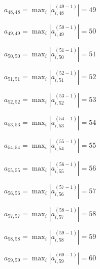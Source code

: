 \documentclass[a4paper,12pt]{article}
\begin{document}
$a _{ 48, 48 } =  \max _i |a _{ i, 48 } ^{ (49 - 1) } | = 49$

$a _{ 49, 49 } =  \max _i |a _{ i, 49 } ^{ (50 - 1) } | = 50$

$a _{ 50, 50 } =  \max _i |a _{ i, 50 } ^{ (51 - 1) } | = 51$

$a _{ 51, 51 } =  \max _i |a _{ i, 51 } ^{ (52 - 1) } | = 52$

$a _{ 52, 52 } =  \max _i |a _{ i, 52 } ^{ (53 - 1) } | = 53$

$a _{ 53, 53 } =  \max _i |a _{ i, 53 } ^{ (54 - 1) } | = 54$

$a _{ 54, 54 } =  \max _i |a _{ i, 54 } ^{ (55 - 1) } | = 55$

$a _{ 55, 55 } =  \max _i |a _{ i, 55 } ^{ (56 - 1) } | = 56$

$a _{ 56, 56 } =  \max _i |a _{ i, 56 } ^{ (57 - 1) } | = 57$

$a _{ 57, 57 } =  \max _i |a _{ i, 57 } ^{ (58 - 1) } | = 58$

$a _{ 58, 58 } =  \max _i |a _{ i, 58 } ^{ (59 - 1) } | = 59$

$a _{ 59, 59 } =  \max _i |a _{ i, 59 } ^{ (60 - 1) } | = 60$
\end{document}
